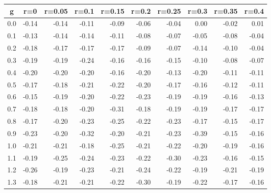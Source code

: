 %
\begin{table}[!tbp]
 \begin{center}
 \begin{tabular}{rrrrrrrrrr}\hline\hline
\multicolumn{1}{c}{g}&\multicolumn{1}{c}{r=0}&\multicolumn{1}{c}{r=0.05}&\multicolumn{1}{c}{r=0.1}&\multicolumn{1}{c}{r=0.15}&\multicolumn{1}{c}{r=0.2}&\multicolumn{1}{c}{r=0.25}&\multicolumn{1}{c}{r=0.3}&\multicolumn{1}{c}{r=0.35}&\multicolumn{1}{c}{r=0.4}\tabularnewline
\hline
0.0&-0.14&-0.14&-0.11&-0.09&-0.06&-0.04& 0.00&-0.02& 0.01\tabularnewline
0.1&-0.13&-0.14&-0.14&-0.11&-0.08&-0.07&-0.05&-0.08&-0.04\tabularnewline
0.2&-0.18&-0.17&-0.17&-0.17&-0.09&-0.07&-0.14&-0.10&-0.04\tabularnewline
0.3&-0.19&-0.19&-0.24&-0.16&-0.16&-0.15&-0.10&-0.08&-0.07\tabularnewline
0.4&-0.20&-0.20&-0.20&-0.16&-0.20&-0.13&-0.20&-0.11&-0.11\tabularnewline
0.5&-0.17&-0.18&-0.21&-0.22&-0.20&-0.17&-0.16&-0.12&-0.11\tabularnewline
0.6&-0.15&-0.19&-0.20&-0.22&-0.23&-0.19&-0.19&-0.16&-0.13\tabularnewline
0.7&-0.18&-0.18&-0.20&-0.31&-0.18&-0.19&-0.19&-0.17&-0.17\tabularnewline
0.8&-0.17&-0.20&-0.23&-0.25&-0.22&-0.23&-0.17&-0.15&-0.17\tabularnewline
0.9&-0.23&-0.20&-0.32&-0.20&-0.21&-0.23&-0.39&-0.15&-0.16\tabularnewline
1.0&-0.21&-0.21&-0.18&-0.25&-0.21&-0.22&-0.20&-0.19&-0.16\tabularnewline
1.1&-0.19&-0.25&-0.24&-0.23&-0.22&-0.30&-0.23&-0.16&-0.15\tabularnewline
1.2&-0.26&-0.19&-0.23&-0.21&-0.24&-0.22&-0.19&-0.21&-0.19\tabularnewline
1.3&-0.18&-0.21&-0.21&-0.22&-0.30&-0.19&-0.22&-0.17&-0.16\tabularnewline
\hline
\end{tabular}

\end{center}

\end{table}

